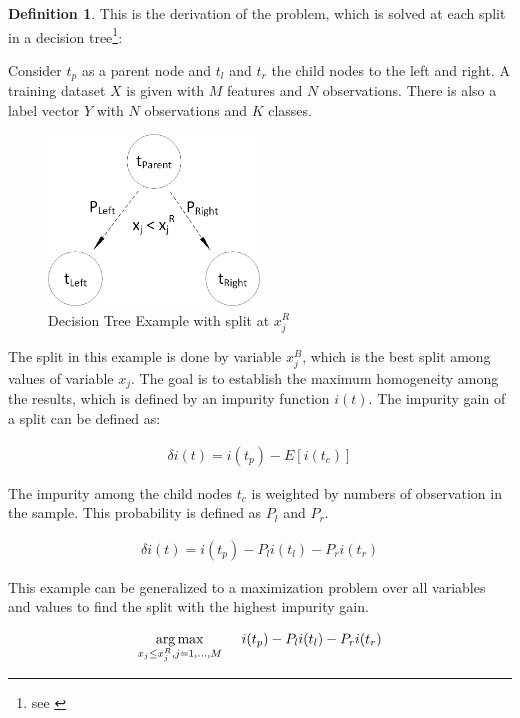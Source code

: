 \documentclass[12pt, a4paper, abstract, parskip]{scrartcl}
\theoremstyle{definition}
\newtheorem{definition}{Definition}[subsection]
\begin{document}
\begin{definition}
This is the derivation of the problem, which is solved at each split in a
decision tree\footnote{see \citet{breiman1984classification}}:

Consider $t_p$ as a parent node and $t_l$ and $t_r$ the child nodes to the left
and right. A training dataset $X$ is given with $M$ features and $N$
observations. There is also a label vector $Y$ with $N$ observations and $K$
classes.

\begin{figure}[!ht]
	\centering
	\includegraphics[width=0.5\textwidth]{graphics/giniimpurity.png}
	\caption{Decision Tree Example with split at $x^R_j$}
	\label{fig:giniimpurity}
\end{figure}

The split in this example is done by variable $x^B_j$, which is the best split
among values of variable $x_j$. The goal is to establish the maximum
homogeneity among the results, which is defined by an impurity function $i(t)$.
The impurity gain of a split can be defined as:

\begin{align*}
\delta i(t) = i(t_p) - E[i(t_c)]
\end{align*}

The impurity among the child nodes $t_c$ is weighted by numbers of observation
in the sample. This probability is defined as $P_l$ and $P_r$.

\begin{align*}
\delta i(t) = i(t_p) - P_li(t_l) - P_ri(t_r)
\end{align*}

This example can be generalized to a maximization problem over all variables
and values to find the split with the highest impurity gain.

\begin{align*}
\underset{x_j\leq x^R_j,j=1,\dots,M}{\arg\max}\hspace{5mm} i(t_p) - P_li(t_l) -P_ri(t_r)
\end{align*}


\end{definition}
\end{document}
